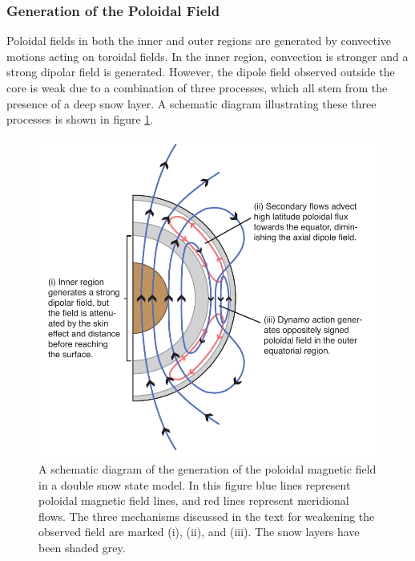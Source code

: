 \subsubsection{Generation of the Poloidal Field}
Poloidal fields in both the inner and outer regions are generated by convective motions acting on toroidal fields. In the inner region, convection is stronger and a strong dipolar field is generated. However, the dipole field observed outside the core is weak due to a combination of three processes, which all stem from the presence of a deep snow layer. A schematic diagram illustrating these three processes is shown in figure \ref{fig:schematicpoloidal}.
\begin{figure}
	\centering
	\noindent\includegraphics[width=30pc]{Chapter4/figures/Schematic-Poloidal.pdf}
	\caption{A schematic diagram of the generation of the poloidal magnetic field in a double snow state model. In this figure blue lines represent poloidal magnetic field lines, and red lines represent meridional flows. The three mechanisms discussed in the text for weakening the observed field are marked (i), (ii), and (iii). The snow layers have been shaded grey.}
	\label{fig:schematicpoloidal}
\end{figure}

